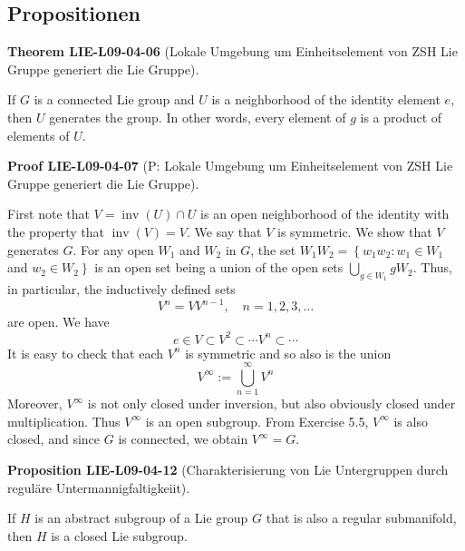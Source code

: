 \documentclass[10pt, letterpaper]{article}
\newcommand{\CustomHeading}[3]{%
  \par\medskip\noindent%
  \textbf{#1 #2} \textnormal{(#3)}.\enskip%
}
\newenvironment{PROP}[2]{\CustomHeading{Proposition}{#1}{#2}}{}
\newenvironment{THEO}[2]{\CustomHeading{Theorem}{#1}{#2}}{}
\newenvironment{PROOF}[2]{\CustomHeading{Proof}{#1}{#2}}{}
\begin{document}
\subsection{Propositionen}

\begin{THEO}{LIE-L09-04-06}{Lokale Umgebung um Einheitselement von ZSH Lie Gruppe generiert die Lie Gruppe}
If $G$ is a connected Lie group and $U$ is a neighborhood of the identity element $e$, then $U$ generates the group. In other words, every element of $g$ is a product of elements of $U$.
\end{THEO}

\begin{PROOF}{LIE-L09-04-07}{P: Lokale Umgebung um Einheitselement von ZSH Lie Gruppe generiert die Lie Gruppe}
First note that $V=\operatorname{inv}(U) \cap U$ is an open neighborhood of the identity with the property that $\operatorname{inv}(V)=V$. We say that $V$ is symmetric. We show that $V$ generates $G$. For any open $W_{1}$ and $W_{2}$ in $G$, the set $W_{1} W_{2}=\left\{w_{1} w_{2}: w_{1} \in W_{1}\right.$ and $\left.w_{2} \in W_{2}\right\}$ is an open set being a union of the open sets $\bigcup_{g \in W_{1}} g W_{2}$. Thus, in particular, the inductively defined sets
$$
V^{n}=V V^{n-1}, \quad n=1,2,3, \ldots
$$
are open. We have
$$
e \in V \subset V^{2} \subset \cdots V^{n} \subset \cdots
$$
It is easy to check that each $V^{n}$ is symmetric and so also is the union
$$
V^{\infty}:=\bigcup_{n=1}^{\infty} V^{n}
$$
Moreover, $V^{\infty}$ is not only closed under inversion, but also obviously closed under multiplication. Thus $V^{\infty}$ is an open subgroup. From Exercise 5.5, $V^{\infty}$ is also closed, and since $G$ is connected, we obtain $V^{\infty}=G$.
\end{PROOF}

\begin{PROP}{LIE-L09-04-12}{Charakterisierung von Lie Untergruppen durch reguläre Untermannigfaltigkeiit}
If $H$ is an abstract subgroup of a Lie group $G$ that is also a regular submanifold, then $H$ is a closed Lie subgroup.
\end{PROP}
\end{document}
